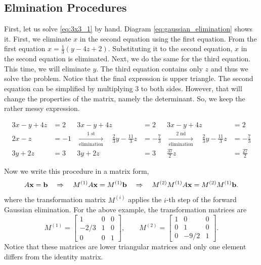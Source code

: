 \subsection{Elmination Procedures}

First, let us solve  \eqref{eq:3x3_1} by hand. Diagram \eqref{eq:gaussian_elimination} shows it.  First, we eliminate $x$ in the second equation  using the first equation.   From the first equation $x=\frac{1}{3}(y -4z +2)$.  Substituting it to the second equation, $x$ in the second equation is eliminated.  Next, we do the same for the third equation. This time, we will eliminate $y$.  The third equation contains only $z$ and thus we solve the problem. Notice that the final expression is upper triangle. 
The second equation can be simplified by multiplying $3$ to both sides.  However, that will change the properties of the matrix, namely the determinant.  So, we keep the rather messy expression.

\small
\begin{subequations}\label{eq:gaussian_elimination}
\begin{align}
3 x - y + 4 z &= 2  & 3 x - y + 4 z &= 2 & 3 x - y + 4 z &= 2 \\
2 x -z &= -1  &\xrightarrow[\text{elimination}]{\text{1 st}} \quad  \frac{2}{3} y - \frac{11}{3} z &= -\frac{7}{3} & \xrightarrow[\text{elimination}]{\text{2 nd}} \quad
\frac{2}{3} y - \frac{11}{3} z &= -\frac{7}{3} \\
3 y + 2z &=  3 & 3 y + 2z &=  3 & \frac{37}{2} z &=  \frac{27}{2}
\end{align}
\end{subequations}
\normalsize


Now we write this procedure in a matrix form,
\begin{equation}
A \vb{x}=\vb{b} \quad \Rightarrow  \quad M^{(1)} A \vb{x}= M^{(1)} \vb{b} \quad \Rightarrow \quad M^{(2)} M^{(1)} A \vb{x}= M^{(2)} M^{(1)} \vb{b}.
\end{equation}
where the transformation matrix $M^{(i)}$ applies the $i$-th step of the forward Gaussian elimination. For the above example, the transformation matrices are
\begin{equation}
M^{(1)} = \begin{bmatrix}1 & 0 & 0\\ -2/3 & 1 & 0 \\ 0 & 0 & 1 \end{bmatrix}, \qquad M^{(2)} = \begin{bmatrix}1 & 0 & 0\\ 0 & 1 & 0 \\ 0 & -9/2 & 1 \end{bmatrix}.
\end{equation}
Notice that these matrices are lower triangular matrices and only one element differs from the identity matrix.

